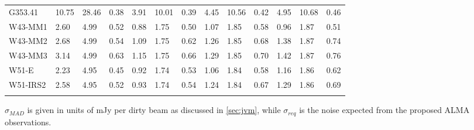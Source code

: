 \begin{table}[htbp!]
\begin{tabular}{@{\extracolsep{4pt}}lllllllllllll@{}}
G353.41  &  10.75 & 28.46 & 0.38 & 3.91 & 10.01 & 0.39 & 4.45 & 10.56 & 0.42 & 4.95 & 10.68 & 0.46 \\
W43-MM1  &  2.60 & 4.99 & 0.52 & 0.88 & 1.75 & 0.50 & 1.07 & 1.85 & 0.58 & 0.96 & 1.87 & 0.51 \\
W43-MM2  &  2.68 & 4.99 & 0.54 & 1.09 & 1.75 & 0.62 & 1.26 & 1.85 & 0.68 & 1.38 & 1.87 & 0.74 \\
W43-MM3  &  3.14 & 4.99 & 0.63 & 1.15 & 1.75 & 0.66 & 1.29 & 1.85 & 0.70 & 1.42 & 1.87 & 0.76 \\
W51-E  &  2.23 & 4.95 & 0.45 & 0.92 & 1.74 & 0.53 & 1.06 & 1.84 & 0.58 & 1.16 & 1.86 & 0.62 \\
W51-IRS2  &  2.58 & 4.95 & 0.52 & 0.93 & 1.74 & 0.54 & 1.24 & 1.84 & 0.67 & 1.29 & 1.86 & 0.69 \\
\hline \noalign {\smallskip}
\end{tabular}
\begin{tablenotes}
\item $\sigma_{MAD}$ is given in units of mJy per dirty beam as discussed in \cref{sec:jvm}, while $\sigma_{req}$ is the noise expected from the proposed ALMA observations.
\end{tablenotes}
\end{table}
